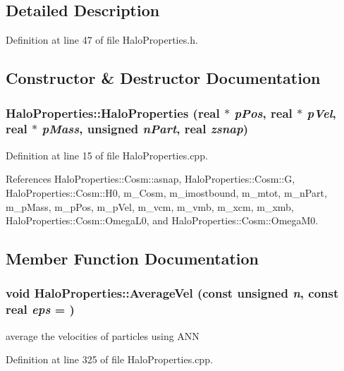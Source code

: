 \subsection{Detailed Description}


Definition at line 47 of file HaloProperties.h.



\subsection{Constructor \& Destructor Documentation}
\subsubsection[{HaloProperties}]{\setlength{\rightskip}{0pt plus 5cm}HaloProperties::HaloProperties ({\bf real} $\ast$ {\em pPos}, \/  {\bf real} $\ast$ {\em pVel}, \/  {\bf real} $\ast$ {\em pMass}, \/  unsigned {\em nPart}, \/  {\bf real} {\em zsnap})}\label{classHaloProperties_abee7f4c745501bce6db44b07ceb8f276}


Definition at line 15 of file HaloProperties.cpp.



References HaloProperties::Cosm::asnap, HaloProperties::Cosm::G, HaloProperties::Cosm::H0, m\_\-Cosm, m\_\-imostbound, m\_\-mtot, m\_\-nPart, m\_\-pMass, m\_\-pPos, m\_\-pVel, m\_\-vcm, m\_\-vmb, m\_\-xcm, m\_\-xmb, HaloProperties::Cosm::OmegaL0, and HaloProperties::Cosm::OmegaM0.



\subsection{Member Function Documentation}
\subsubsection[{AverageVel}]{\setlength{\rightskip}{0pt plus 5cm}void HaloProperties::AverageVel (const unsigned {\em n}, \/  const {\bf real} {\em eps} = {})}\label{classHaloProperties_abcee0f6284cf4991bf89cc6aafd84f60}
average the velocities of particles using ANN 

Definition at line 325 of file HaloProperties.cpp.



